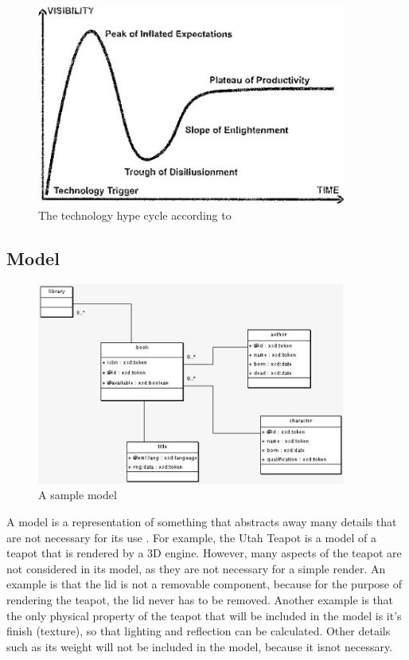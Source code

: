 \begin{figure}
\begin{center}
	\includegraphics[width=4in]{figures/mde_pos.jpg}
\end{center}
\caption{The technology hype cycle according to \citet{brambillaBook}}
\label{mde_pos}
\end{figure}

\subsection{Model}

\begin{figure}
\begin{center}
	\includegraphics[width=4in]{figures/sample_model.jpg}
\end{center}
\caption{A sample model}
\label{uml_sample}
\end{figure}

A model is a representation of something that abstracts away many details that are not necessary for its use \citep{brambillaBook}. For example, the Utah Teapot \citep{utahTeapot} is a model of a teapot that is rendered by a 3D engine. However, many aspects of the teapot are not considered in its model, as they are not necessary for a simple render. An example is that the lid is not a removable component, because for the purpose of rendering the teapot, the lid never has to be removed. Another example is that the only physical property of the teapot that will be included in the model is it's finish (texture), so that lighting and reflection can be calculated. Other details such as its weight will not be included in the model, because it isnot necessary.

